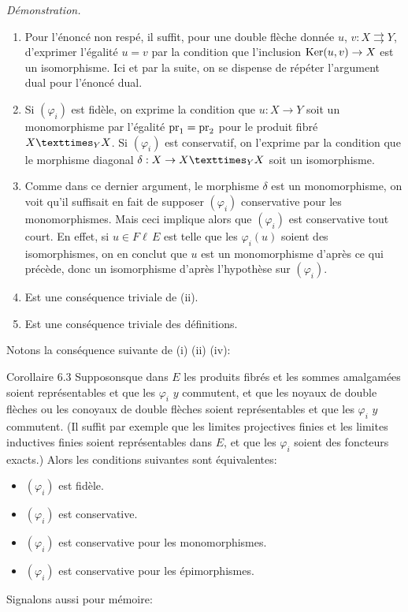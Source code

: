 \documentclass[10pt]{../fichiers-configuration-latex/smfart}
\def\labelenumi{(\theenumi)}
\begin{document}
\noindent \emph{Démonstration.}
\begin{enumerate}
\renewcommand{\theenumi}{\roman{enumi}}
\renewcommand{\labelenumi}{(\theenumi)}
\item Pour l'énoncé non respé, il suffit, pour une double
  flèche donnée $u$, $v:X\rightrightarrows Y$, d'exprimer
  l'égalité $u=v$ par la condition que l'inclusion
  $\operatorname{Ker}(u,v)\rightarrow X$ est un isomorphisme. Ici et par la suite,
  on se dispense de répéter l'argument dual pour l'énoncé
  dual.

\item Si $(\varphi_i)$ est fidèle, on exprime la condition que
  $u:X\rightarrow Y$ soit un monomorphisme par l'égalité
  $\operatorname{pr}_1=\operatorname{pr}_2$ pour le produit fibré $\fprod{X}{X}{Y}$. Si $(\varphi_i)$
  est conservatif, on l'exprime par la condition que le morphisme
  diagonal $\delta:X\rightarrow \fprod{X}{X}{Y}$ soit un isomorphisme.

\setcounter{enumi}{3}
\item Comme dans ce dernier argument, le morphisme $\delta$ est un
  monomorphisme, on voit qu'il suffisait en fait de supposer
  $(\varphi_i)$ conservative pour les monomorphismes. Mais ceci
  implique alors que $(\varphi_i)$ est conservative tout court. En
  effet, si $u\in %
F\ell\,E$ est telle que les $\varphi_i(u)$ soient des
  isomorphismes, on en conclut que $u$ est un monomorphisme
  d'après ce qui précède, donc un isomorphisme d'après
  l'hypothèse sur $(\varphi_i)$.

\setcounter{enumi}{2}
\item Est une conséquence triviale de (ii).

\setcounter{enumi}{4}
\item Est une conséquence triviale des définitions.
\end{enumerate}

Notons la conséquence suivante de (i) (ii) (iv):

\begin{enonce*}{Corollaire 6.3}
Supposons\pageoriginale que dans $E$ les produits fibrés et les
sommes amalgamées soient représentables et que les $\varphi_i$ $y$
commutent, et que les noyaux de double flèches ou les conoyaux de
double flèches soient représentables et que les $\varphi_i$ $y$
commutent. (Il suffit par exemple que les limites projectives finies
et les limites inductives finies soient représentables dans $E$, et
que les $\varphi_i$ soient des foncteurs exacts.) Alors les
conditions suivantes sont équivalentes:
\begin{itemize}
\item[a)] $(\varphi_i)$ est fidèle.

\item[b)] $(\varphi_i)$ est conservative.

\item[c)] $(\varphi_i)$ est conservative pour les monomorphismes.

\item[${\rm c')}$] $(\varphi_i)$ est conservative pour les épimorphismes.
\end{itemize}
\end{enonce*}
Signalons aussi pour mémoire:
\end{document}
